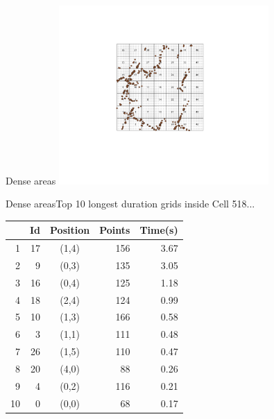 \documentclass{beamer}
\begin{document}
\begin{frame}{Dense areas}
    \centering
    \includegraphics[trim={300 300 300 210}, clip, width=0.6\textwidth]{figures/cell518_grids}
\end{frame}

\begin{frame}{Dense areas}{Top 10 longest duration grids inside Cell 518...}
        \begin{table}[ht]
                \centering
                \begin{tabular}{r r c r r}
                        \hline
                        & \textbf{Id} & \textbf{Position} & \textbf{Points} & \textbf{Time(s)} \\
                        \hline
                        1 & 17 & (1,4) & 156 & 3.67 \\
                        2 & 9 & (0,3) & 135 & 3.05 \\
                        3 & 16 & (0,4) & 125 & 1.18 \\
                        4 & 18 & (2,4) & 124 & 0.99 \\
                        5 & 10 & (1,3) & 166 & 0.58 \\
                        6 & 3 & (1,1) & 111 & 0.48 \\
                        7 & 26 & (1,5) & 110 & 0.47 \\
                        8 & 20 & (4,0) & 88 & 0.26 \\
                        9 & 4 & (0,2) & 116 & 0.21 \\
                        10 & 0 & (0,0) & 68 & 0.17 \\
                        \hline
                \end{tabular}
        \end{table}
\end{frame}
\end{document}

